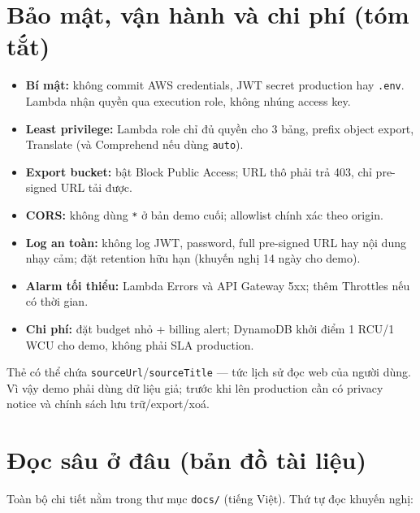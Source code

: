 \documentclass[11pt,a4paper]{article}
\newcommand{\code}[1]{\texttt{#1}}
\begin{document}
\section{Bảo mật, vận hành và chi phí (tóm tắt)}

\begin{itemize}
  \item \textbf{Bí mật:} không commit AWS credentials, JWT secret production hay \code{.env}.
        Lambda nhận quyền qua execution role, không nhúng access key.
  \item \textbf{Least privilege:} Lambda role chỉ đủ quyền cho 3 bảng, prefix object export,
        Translate (và Comprehend nếu dùng \code{auto}).
  \item \textbf{Export bucket:} bật Block Public Access; URL thô phải trả 403, chỉ pre-signed URL tải được.
  \item \textbf{CORS:} không dùng \code{*} ở bản demo cuối; allowlist chính xác theo origin.
  \item \textbf{Log an toàn:} không log JWT, password, full pre-signed URL hay nội dung nhạy cảm;
        đặt retention hữu hạn (khuyến nghị 14 ngày cho demo).
  \item \textbf{Alarm tối thiểu:} Lambda Errors và API Gateway 5xx; thêm Throttles nếu có thời gian.
  \item \textbf{Chi phí:} đặt budget nhỏ + billing alert; DynamoDB khởi điểm 1 RCU/1 WCU cho demo,
        không phải SLA production.
\end{itemize}

\begin{note}
Thẻ có thể chứa \code{sourceUrl}/\code{sourceTitle} — tức lịch sử đọc web của người dùng. Vì vậy
demo phải dùng dữ liệu giả; trước khi lên production cần có privacy notice và chính sách
lưu trữ/export/xoá.
\end{note}

\section{Đọc sâu ở đâu (bản đồ tài liệu)}

Toàn bộ chi tiết nằm trong thư mục \code{docs/} (tiếng Việt). Thứ tự đọc khuyến nghị:
\end{document}
